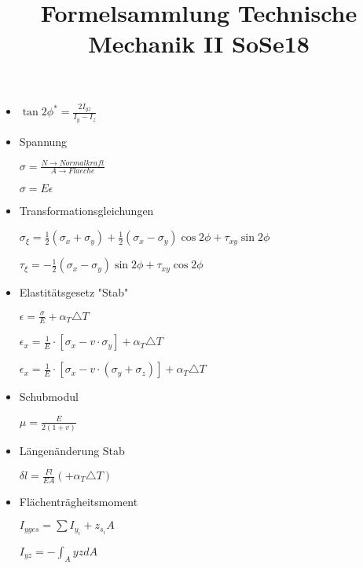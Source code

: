 \documentclass{tudexercise}
\begin{document}
	\title{Formelsammlung Technische Mechanik II SoSe18}
	\date{}
	\author{}
    \maketitle
\large	
\begin{minipage}[t]{0,47 \textwidth}
	\begin{itemize}
        
       
        \item 
         
        $\tan2\phi^* = \frac{2I_{yz}}{I_y - I_z}$
        
        \item{Spannung}
        
        $\sigma = \frac{N \rightarrow Normalkraft}{A \rightarrow Flaeche}$
             
        $\sigma = E \epsilon$
        
        \item{Transformationsgleichungen}
        
        $\sigma_\xi = \frac{1}{2}(\sigma_x + \sigma_y) + \frac{1}{2}(\sigma_x - \sigma_y)\cos2\phi+\tau_{xy}\sin2\phi        
        $
        
        $\tau_{\xi} =           -\frac{1}{2}(\sigma_x - \sigma_y)\sin2\phi+\tau_{xy}\cos2\phi$
        
		\item{Elastit\"atsgesetz "Stab"}
        
        $\epsilon = \frac{\sigma}{E}+\alpha_T\triangle T$
		
		$\epsilon_x = \frac{1}{E}\cdot[\sigma_x - v \cdot \sigma_y] + \alpha_T\triangle T  $
		
    	$	\epsilon_x = \frac{1}{E}\cdot[\sigma_x - v \cdot (\sigma_y + \sigma_z)] + \alpha_T\triangle T  
    	$	

		\item{Schubmodul}
	
		$\mu = \frac{E}{2(1+v)} $

        \item{L\"angen\"anderung Stab}
        
        $\delta l = \frac{Fl}{EA} (+   \alpha_T\triangle T)$
        
        \item{Fl\"achentr\"agheitsmoment}
        
        $I_{yges} = \sum I_{y_i} + z_{s_i}A$
        
        $I_{yz} = -\int_{A}^{}yz dA $
        

\end{itemize}
\end{minipage}
\end{document}
